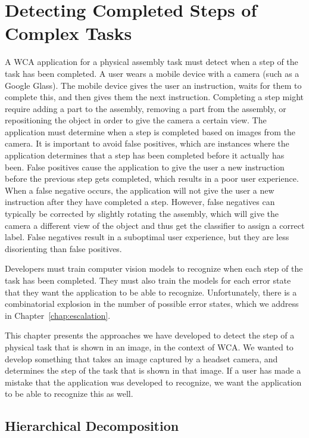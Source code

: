 \chapter{Detecting Completed Steps of Complex Tasks}\label{chap:detection}

A WCA application for a physical assembly task must detect when a step of the
task has been completed.
A user wears a mobile device with a camera (such as a Google Glass).
The mobile
device gives the user an instruction, waits for them to complete this, and then
gives them the next instruction.
Completing a step might require adding a part to the assembly,
removing a part from the assembly, or repositioning the object in order to give
the camera a certain view.
The application must determine when a step is completed
based on images from the camera.
It is important to avoid false positives, which are instances where the
application determines that a step has been completed before it actually has
been.
False positives cause the application to give the user a new instruction before
the previous step gets completed, which results in a poor user experience.
When a false negative occurs, the application will not give the user a new
instruction after they have completed a step.
However, false negatives can typically be corrected by slightly rotating the
assembly, which will give the camera a different view of the object and thus get
the classifier to assign a correct label.
False negatives result in a suboptimal user experience, but they
are less disorienting than false positives.

Developers must train computer vision models to recognize when each step of the
task has been completed.
They must also train the models for each error state that they want the
application to be able to recognize.
Unfortunately, there is a combinatorial explosion in the number of possible
error states, which we address in Chapter~\ref{chap:escalation}.

This chapter presents the approaches we have developed to detect the step of a
physical task that is shown in an image, in the context of WCA.
We wanted to develop something that takes an image captured by a headset
camera, and determines the step of the task that is shown in that image.
If a user has made a mistake that the application was developed to recognize, we
want the application to be able to recognize this as well.

\section{Hierarchical Decomposition}

